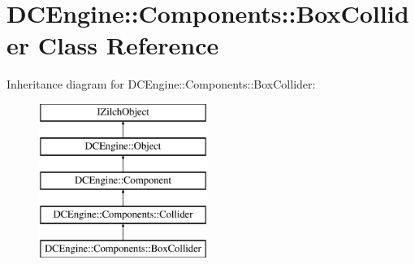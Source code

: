 \hypertarget{classDCEngine_1_1Components_1_1BoxCollider}{\section{D\-C\-Engine\-:\-:Components\-:\-:Box\-Collider Class Reference}
\label{classDCEngine_1_1Components_1_1BoxCollider}
}
Inheritance diagram for D\-C\-Engine\-:\-:Components\-:\-:Box\-Collider\-:\begin{figure}[H]
\begin{center}
\leavevmode
\includegraphics[height=5.000000cm]{classDCEngine_1_1Components_1_1BoxCollider}
\end{center}
\end{figure}

